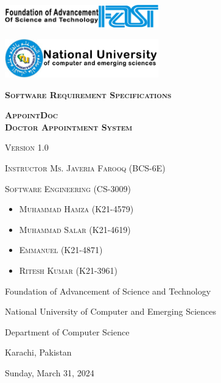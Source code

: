 \documentclass[a4paper, 12pt]{article}
\begin{document}
\begin{titlepage}
    \centering
    \vspace{3.5cm}
    \includegraphics[width=0.5\textwidth]{FAST.png}\par\vspace{1cm}
    \includegraphics[width=0.5\textwidth]{NU-logo.jpg}\par\vspace{1cm}
    \vspace{1.5cm}
    {\scshape\LARGE\textbf {Software Requirement Specifications} \par}
    \vspace{1.5cm}
    {\scshape\LARGE\textbf {AppointDoc\\Doctor Appointment System\\} \par}
    {\scshape\Large Version 1.0 \par}
    \vspace{1.5cm}
    {\scshape\Large Instructor Ms. Javeria Farooq (BCS-6E)\\ \par}
    {\scshape\Large Software Engineering (CS-3009) \par}
    \vspace{1.5cm}
    \begin{itemize}
    \item {\scshape\Large Muhammad Hamza (K21-4579) \par}
    \vspace{0.12cm}
    \item {\scshape\Large Muhammad Salar (K21-4619) \par}
    \vspace{0.12cm}
    \item {\scshape\Large Emmanuel (K21-4871) \par}
    \vspace{0.12cm}
    \item {\scshape\Large Ritesh Kumar (K21-3961) \par}
    \end{itemize}
    \vfill   
    {Foundation of Advancement of Science and Technology \par}
    {National University of Computer and Emerging Sciences \par}
    {Department of Computer Science \par}
    {Karachi, Pakistan \par}
    {Sunday, March 31, 2024 \par}
\end{titlepage}
\end{document}
